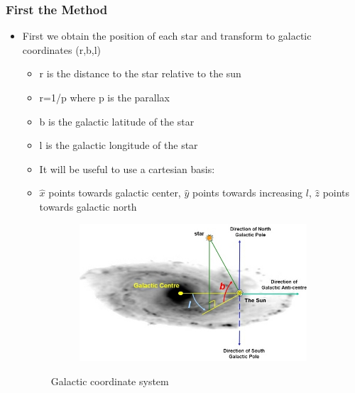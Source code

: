 \documentclass{beamer}
\begin{document}
\begin{frame}
\frametitle{First the Method}
\begin{itemize}
\item First we obtain the position of each star and transform to galactic coordinates (r,b,l)
\begin{itemize}
\item r is the distance to the star relative to the sun
\item r=1/p where p is the parallax
\item b is the galactic latitude of the star
\item l is the galactic longitude of the star
\item It will be useful to use a cartesian basis:
\item $\hat{x}$ points towards galactic center, $\hat{y}$ points towards increasing $l$, $\hat{z}$ points towards galactic north
\end{itemize}

\begin{figure}[h!]
  \centering
  \begin{subfigure}[b]{0.55\linewidth}
    \includegraphics[width=\linewidth]{galCoordIm2}
  \end{subfigure}
    \caption{Galactic coordinate system}
\end{figure}


\end{itemize}
\end{frame}
\end{document}
